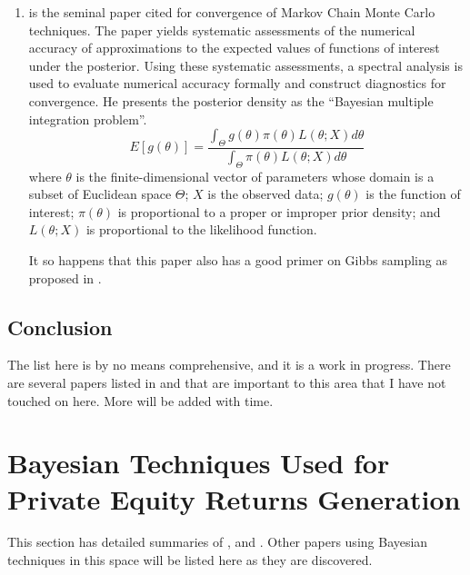 \documentclass[final,5p,times,twocolumn,authoryear]{elsarticle}
\begin{document}
\begin{enumerate}[resume, label=(\roman*)]
	\item \cite{Geweke1991} is the seminal paper cited for convergence of Markov Chain Monte Carlo techniques. The paper yields systematic assessments of the numerical accuracy of approximations to the expected values of functions of interest under the posterior. Using these systematic assessments, a spectral analysis is used to evaluate numerical accuracy formally and construct diagnostics for convergence. He presents the posterior density as the ``Bayesian multiple integration problem''.
	\begin{equation}
		E [ g(\theta) ] = \frac{\int_\Theta g(\theta) \pi(\theta) L(\theta; X) d\theta}{\int_\Theta \pi(\theta) L(\theta; X) d\theta}
	\end{equation}
	where $\theta$ is the finite-dimensional vector of parameters whose domain is a subset of Euclidean space $\Theta$; $X$ is the observed data; $g(\theta)$ is the function of interest; $\pi(\theta)$ is proportional to a proper or improper prior density; and $L(\theta; X)$ is proportional to the likelihood function.
	
	It so happens that this paper also has a good primer on Gibbs sampling as proposed in \cite{Geman1984}. 

\end{enumerate}

\subsection{Conclusion}

The list here is by no means comprehensive, and it is a work in progress. There are several papers listed in \cite{Kaplan2015} and \cite{Korteweg2019} that are important to this area that I have not touched on here. More will be added with time.

\section{Bayesian Techniques Used for Private Equity Returns Generation}

This section has detailed summaries of \cite{Ang2014}, and \cite{Korteweg2011}. Other papers using Bayesian techniques in this space will be listed here as they are discovered.

\subsection{\cite{Ang2014}}
\label{sec:bayesian_ang}
\end{document}
